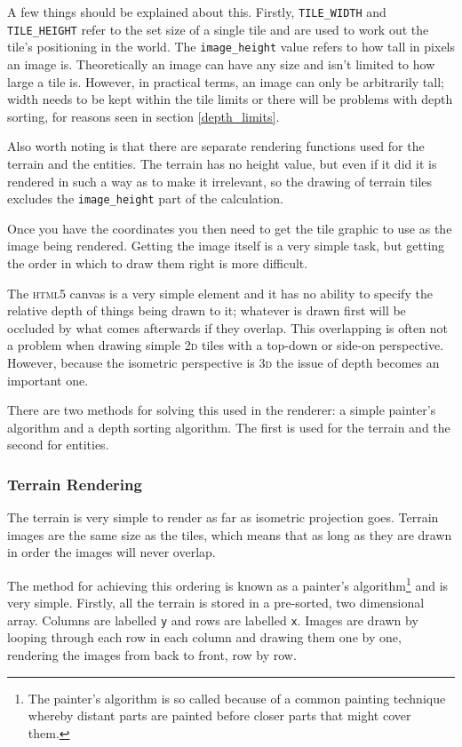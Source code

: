 A few things should be explained about this. Firstly, \texttt{TILE\_WIDTH} and \texttt{TILE\_HEIGHT} refer to the set size of a single tile and are used to work out the tile's positioning in the world. The \texttt{image\_height} value refers to how tall in pixels an image is. Theoretically an image can have any size and isn't limited to how large a tile is. However, in practical terms, an image can only be arbitrarily tall; width needs to be kept within the tile limits or there will be problems with depth sorting, for reasons seen in section \ref{depth_limits}.


Also worth noting is that there are separate rendering functions used for the terrain and the entities. The terrain has no height value, but even if it did it is rendered in such a way as to make it irrelevant, so the drawing of terrain tiles excludes the \texttt{image\_height} part of the calculation.

Once you have the coordinates you then need to get the tile graphic to use as the image being rendered. Getting the image itself is a very simple task, but getting the order in which to draw them right is more difficult.

The \textsc{html5} canvas is a very simple element and it has no ability to specify the relative depth of things being drawn to it; whatever is drawn first will be occluded by what comes afterwards if they overlap. This overlapping is often not a problem when drawing simple \textsc{2d} tiles with a top-down or side-on perspective. However, because the isometric perspective is \textsc{3d} the issue of depth becomes an important one.


There are two methods for solving this used in the renderer: a simple painter's algorithm and a depth sorting algorithm. The first is used for the terrain and the second for entities.

\subsubsection{Terrain Rendering}
The terrain is very simple to render as far as isometric projection goes. Terrain images are the same size as the tiles, which means that as long as they are drawn in order the images will never overlap.

The method for achieving this ordering is known as a painter's algorithm\footnote{The painter's algorithm is so called because of a common painting technique whereby distant parts are painted before closer parts that might cover them.} and is very simple. Firstly, all the terrain is stored in a pre-sorted, two dimensional array. Columns are labelled \texttt{y} and rows are labelled \texttt{x}. Images are drawn by looping through each row in each column and drawing them one by one, rendering the images from back to front, row by row.


